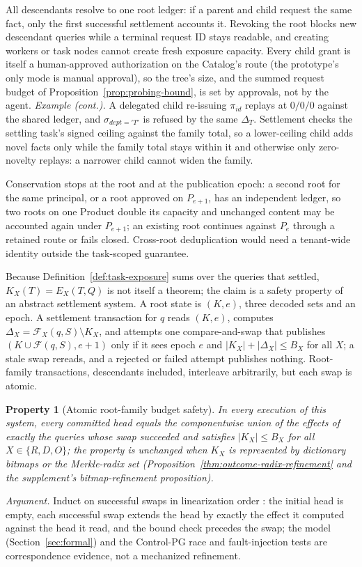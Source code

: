 \documentclass[10pt,journal,compsoc]{IEEEtran}
\newcommand{\code}[1]{\texttt{\detokenize{#1}}}
\newcommand{\facts}{\mathcal{F}}
\newtheorem{property}{Property}
\begin{document}
All descendants resolve to one root ledger: if a parent and child request
the same fact, only the first successful settlement accounts it. Revoking
the root blocks new descendant queries while a terminal request ID stays
readable, and creating workers or task nodes cannot create fresh exposure
capacity. Every child grant is itself a human-approved authorization on
the Catalog's route (the prototype's only mode is manual approval), so the
tree's size, and the summed request budget of
Proposition~\ref{prop:probing-bound}, is set by approvals, not by the
agent. \emph{Example (cont.).} A delegated child re-issuing $\pi_{id}$ replays
at $0/0/0$ against the shared ledger, and $\sigma_{dept='T'}$ is refused
by the same $\Delta_T$. Settlement checks the settling task's signed ceiling against the
family total, so a lower-ceiling child adds novel facts only while the
family total stays within it and otherwise only zero-novelty
replays: a narrower child cannot widen the family.

Conservation stops at the root and at the publication epoch: a second root
for the same principal, or a root approved on $P_{e+1}$, has an independent
ledger, so two roots on one Product double its capacity and unchanged
content may be accounted again under $P_{e+1}$; an existing root continues
against $P_e$ through a retained route or fails closed. Cross-root
deduplication would need a tenant-wide identity outside the task-scoped
guarantee.

Because Definition~\ref{def:task-exposure} sums over the queries that
settled, $K_X(T)=E_X(T,Q)$ is not itself a theorem; the claim is a safety
property of an abstract settlement system. A root state is $(K,e)$, three
decoded sets and an epoch. A settlement transaction for $q$ reads $(K,e)$,
computes $\Delta_X=\facts_X(q,S)\setminus K_X$, and attempts one
compare-and-swap that publishes $(K\cup\facts(q,S),e+1)$ only if it sees
epoch $e$ and $|K_X|+|\Delta_X|\le B_X$ for all $X$; a stale swap rereads,
and a rejected or failed attempt publishes nothing. Root-family
transactions, descendants included, interleave arbitrarily, but each swap
is atomic.

\begin{property}[Atomic root-family budget safety]
\label{thm:root-family-safety}
In every execution of this system, every committed head equals the
componentwise union of the effects of exactly the queries whose swap
succeeded and satisfies $|K_X|\le B_X$ for all $X\in\{R,D,O\}$; the
property is unchanged when $K_X$ is represented by dictionary bitmaps or the
Merkle-radix set (Proposition~\ref{thm:outcome-radix-refinement} and the
supplement's bitmap-refinement proposition).
\end{property}
\emph{Argument.} Induct on successful swaps in linearization order
\cite{herlihy1990linearizability}: the
initial head is empty, each successful swap extends the head by exactly the
effect it computed against the head it read, and the bound check precedes
the swap; the \code{ExposureLedger} model (Section~\ref{sec:formal}) and
the Control-PG race and fault-injection tests are correspondence evidence,
not a mechanized refinement.
\end{document}
